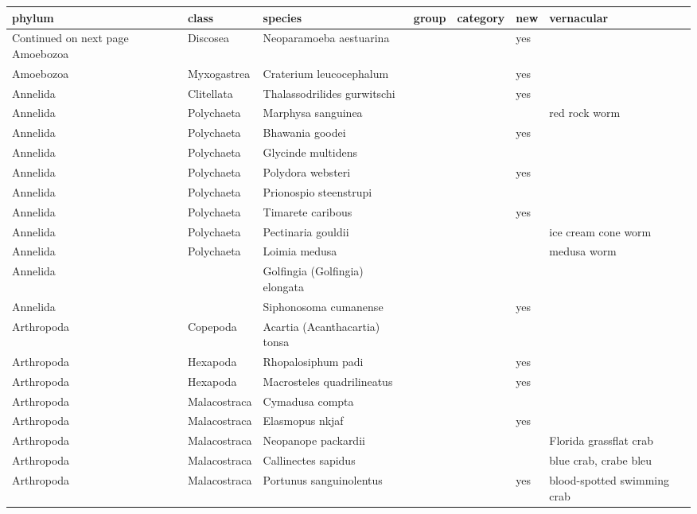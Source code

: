 \begingroup\fontsize{9pt}{10pt}\selectfont
\begin{longtable}{lllllll}
  \hline
phylum & class & species & group & category & new & vernacular \\ 
  \hline 
\endhead 
\hline 
{\footnotesize Continued on next page} 
\endfoot 
\endlastfoot 
Amoebozoa & Discosea & Neoparamoeba aestuarina &  &  & yes &  \\ 
  Amoebozoa & Myxogastrea & Craterium leucocephalum &  &  & yes &  \\ 
  Annelida & Clitellata & Thalassodrilides gurwitschi &  &  & yes &  \\ 
  Annelida & Polychaeta & Marphysa sanguinea &  &  &  & red rock worm \\ 
  Annelida & Polychaeta & Bhawania goodei &  &  & yes &  \\ 
  Annelida & Polychaeta & Glycinde multidens &  &  &  &  \\ 
  Annelida & Polychaeta & Polydora websteri &  &  & yes &  \\ 
  Annelida & Polychaeta & Prionospio steenstrupi &  &  &  &  \\ 
  Annelida & Polychaeta & Timarete caribous &  &  & yes &  \\ 
  Annelida & Polychaeta & Pectinaria gouldii &  &  &  & ice cream cone worm \\ 
  Annelida & Polychaeta & Loimia medusa &  &  &  & medusa worm \\ 
  Annelida &  & Golfingia (Golfingia) elongata &  &  &  &  \\ 
  Annelida &  & Siphonosoma cumanense &  &  & yes &  \\ 
  Arthropoda & Copepoda & Acartia (Acanthacartia) tonsa &  &  &  &  \\ 
  Arthropoda & Hexapoda & Rhopalosiphum padi &  &  & yes &  \\ 
  Arthropoda & Hexapoda & Macrosteles quadrilineatus &  &  & yes &  \\ 
  Arthropoda & Malacostraca & Cymadusa compta &  &  &  &  \\ 
  Arthropoda & Malacostraca & Elasmopus nkjaf &  &  & yes &  \\ 
  Arthropoda & Malacostraca & Neopanope packardii &  &  &  & Florida grassflat crab \\ 
  Arthropoda & Malacostraca & Callinectes sapidus &  &  &  & blue crab, crabe bleu \\ 
  Arthropoda & Malacostraca & Portunus sanguinolentus &  &  & yes & blood-spotted swimming crab \\ 

\end{longtable}
